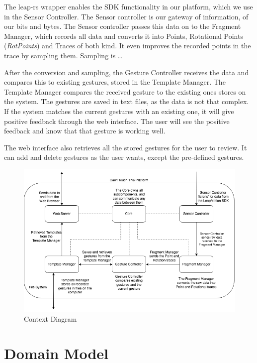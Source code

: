 \documentclass[a4paper]{article}
\begin{document}
  The leap-rs wrapper enables the SDK functionality in our platform, which we
  use in the Sensor Controller. The Sensor controller is our gateway of
  information, of our bits and bytes. The Sensor controller passes this data on
  to the Fragment Manager, which records all data and converts it into Points,
  Rotational Points (\textit{RotPoints}) and Traces of both kind. It even
  improves the recorded points in the trace by sampling them. Sampling is
  \ldots{}

  After the conversion and sampling, the Gesture Controller receives the data
  and compares this to existing gestures, stored in the Template Manager. The
  Template Manager compares the received gesture to the existing ones stores on
  the system. The gestures are saved in text files, as the data is not that
  complex. If the system matches the current gestures with an existing one, it
  will give positive feedback through the web interface. The user will see the
  positive feedback and know that that gesture is working well.

  The web interface also retrieves all the stored gestures for the user to
  review. It can add and delete gestures as the user wants, except the
  pre-defined gestures.

  \begin{figure}[h]
    \caption{Context Diagram}
    \centering
    \includegraphics[width=\linewidth]{functional-diagram}
  \end{figure}
  \clearpage

  \section{Domain Model}
  \clearpage
\end{document}
